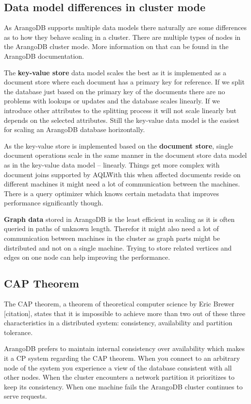 \subsection{Data model differences in cluster mode}
As ArangoDB supports multiple data models there naturally are some differences as to how they behave scaling in a cluster. There are multiple types of nodes in the ArangoDB cluster mode. More information on that can be found in the ArangoDB documentation.
\medskip

The \textbf{key-value store} data model scales the best as it is implemented as a document store where each document has a primary key for reference. If we split the database just based on the primary key of the documents there are no problems with lookups or updates and the database scales linearly. If we introduce other attributes to the splitting process it will not scale linearly but depends on the selected attributes. Still the key-value data model is the easiest for scaling an ArangoDB database horizontally.
\medskip

As the key-value store is implemented based on the \textbf{document store}, single document operations scale in the same manner in the document store data model as in the key-value data model -- linearly. Things get more complex with document joins supported by AQL\. With this when affected documents reside on different machines it might need a lot of communication between the machines. There is a query optimizer which knows certain metadata that improves performance significantly though.
\medskip

\textbf{Graph data} stored in ArangoDB is the least efficient in scaling as it is often queried in paths of unknown length. Therefor it might also need a lot of communication between machines in the cluster as graph parts might be distributed and not on a single machine. Trying to store related vertices and edges on one node can help improving the performance.
\parencite{ArangoCluster}

\subsection{CAP Theorem}
The CAP theorem, a theorem of theoretical computer science by Eric Brewer [citation], states that it is impossible to achieve more than two out of these three characteristics in a distributed system: consistency, availability and partition tolerance.

ArangoDB prefers to maintain internal consistency over availability which makes it a CP system regarding the CAP theorem. When you connect to an arbitrary node of the system you experience a view of the database consistent with all other nodes. When the cluster encounters a network partition it prioritizes to keep its consistency. When one machine fails the ArangoDB cluster continues to serve requests.
\parencite{ArangoCluster}

